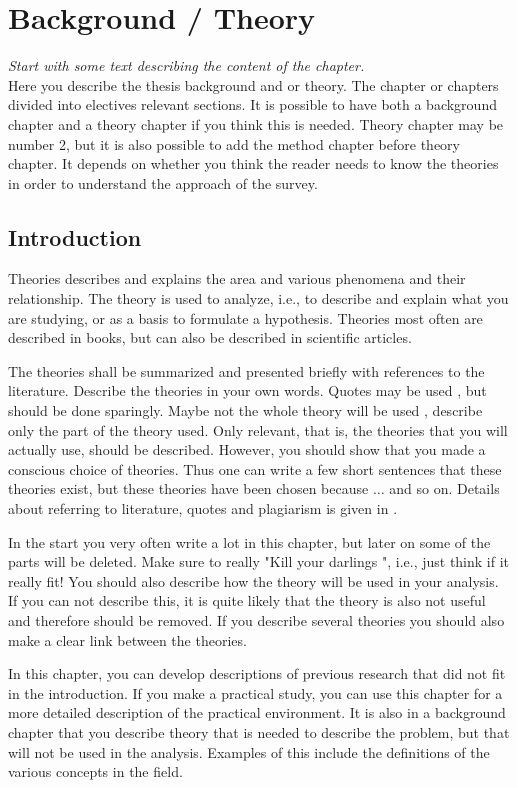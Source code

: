 \chapter{Background / Theory}
\emph{Start with some text describing the content of the chapter.}\\

\noindent Here you describe the thesis background and or theory. The chapter or chapters divided into electives relevant sections. It is possible to have both a background chapter and a theory chapter if you think this is needed. Theory chapter may be number 2, but it is also possible to add the method chapter before theory chapter. It depends on whether you think the reader needs to know the theories in order to understand the approach of the survey.
		
\section{Introduction}
Theories describes and explains the area and various phenomena and their relationship. The theory is used to analyze, i.e., to describe and explain what you are studying, or as a basis to formulate a hypothesis. Theories most often are described in books, but can also be described in scientific articles.

The theories shall be summarized and presented briefly with references to the literature. Describe the theories in your own words. Quotes may be used , but should be done sparingly. Maybe not the whole theory will be used , describe only the part of the theory used. Only relevant, that is, the theories that you will actually use, should be described. However, you should show that you made a conscious choice of theories. Thus one can write a few short sentences that these theories exist, but these theories have been chosen because $\ldots$ and so on. Details about referring to literature, quotes and plagiarism is given in \cite{refero08}. %

In the start you very often write a lot in this chapter, but later on some of the parts will be deleted. Make sure to really "Kill your darlings ", i.e., just think if it really fit! You should also describe how the theory will be used in your analysis. If you can not describe this, it is quite likely that the theory is also not useful and therefore should be removed. If you describe several theories you should also make a clear link between the theories.

In this chapter, you can develop descriptions of previous research that did not fit in the introduction. If you make a practical study, you can use  this chapter for a more detailed description of the practical environment. It is also in a background chapter that you describe theory that is needed to describe the problem, but that will not be used in the analysis. Examples of this include the definitions of the various concepts in the field.
